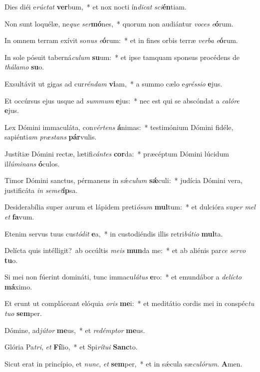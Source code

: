 ﻿Dies diéi e\textit{rúc}\textit{tat} \textbf{ver}bum,~* et nox nocti ín\textit{di}\textit{cat} \textit{sci}\textbf{én}tiam.

Non sunt loquélæ, ne\textit{que} \textit{ser}\textbf{mó}nes,~* quorum non audiántur \textit{vo}\textit{ces} \textit{e}\textbf{ó}rum.

In omnem terram exívit so\textit{nus} \textit{e}\textbf{ó}rum:~* et in fines orbis terræ \textit{ver}\textit{ba} \textit{e}\textbf{ó}rum.

In sole pósuit taberná\textit{cu}\textit{lum} \textbf{su}um:~* et ipse tamquam sponsus procédens de \textit{thá}\textit{la}\textit{mo} \textbf{su}o.

Exsultávit ut gigas ad cur\textit{rén}\textit{dam} \textbf{vi}am,~* a summo cælo e\textit{grés}\textit{si}\textit{o} \textbf{e}jus.

Et occúrsus ejus usque ad \textit{sum}\textit{mum} \textbf{e}jus:~* nec est qui se abscóndat a \textit{ca}\textit{ló}\textit{re} \textbf{e}jus.

Lex Dómini immaculáta, con\textit{vér}\textit{tens} \textbf{á}nimas:~* testimónium Dómini fidéle, sapiénti\textit{am} \textit{præ}\textit{stans} \textbf{pár}vulis.

Justítiæ Dómini rectæ, lætifi\textit{cán}\textit{tes} \textbf{cor}da:~* præcéptum Dómini lúcidum il\textit{lú}\textit{mi}\textit{nans} \textbf{ó}culos.

Timor Dómini sanctus, pérmanens in sǽ\textit{cu}\textit{lum} \textbf{sǽ}culi:~* judícia Dómini vera, justificáta \textit{in} \textit{se}\textit{met}\textbf{íp}sa.

Desiderabília super aurum et lápidem preti\textit{ó}\textit{sum} \textbf{mul}tum:~* et dulcióra su\textit{per} \textit{mel} \textit{et} \textbf{fa}vum.

Etenim servus tuus cus\textit{tó}\textit{dit} \textbf{e}a,~* in custodiéndis illis retri\textit{bú}\textit{ti}\textit{o} \textbf{mul}ta.

Delícta quis intélligit?~\reddagger ab occúltis \textit{me}\textit{is} \textbf{mun}da me:~* et ab aliénis par\textit{ce} \textit{ser}\textit{vo} \textbf{tu}o.

Si mei non fúerint domináti, tunc immacu\textit{lá}\textit{tus} \textbf{e}ro:~* et emundábor a \textit{de}\textit{líc}\textit{to} \textbf{má}ximo.

Et erunt ut compláceant elóquia \textit{o}\textit{ris} \textbf{me}i:~* et meditátio cordis mei in conspéc\textit{tu} \textit{tu}\textit{o} \textbf{sem}per.

Dómine, ad\textit{jú}\textit{tor} \textbf{me}us,~* et \textit{red}\textit{émp}\textit{tor} \textbf{me}us.

Glória Pa\textit{tri}, \textit{et} \textbf{Fí}lio,~* et Spi\textit{rí}\textit{tu}\textit{i} \textbf{Sanc}to.

Sicut erat in princípio, et \textit{nunc}, \textit{et} \textbf{sem}per,~* et in sǽcula sæ\textit{cu}\textit{ló}\textit{rum}. \textbf{A}men.
